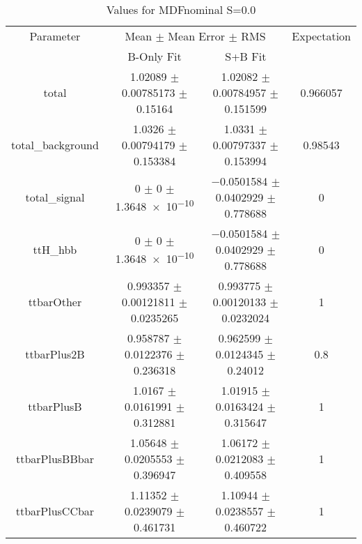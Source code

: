 \begin{table}
\centering
\caption{Values for MDFnominal S=0.0}
\begin{tabular}{cccc}
\toprule
Parameter & \multicolumn{2}{c}{Mean $\pm$ Mean Error $\pm$ RMS} & Expectation\\
 & B-Only Fit & S+B Fit & \\
\midrule
total & \num{1.02089} $\pm$ \num{0.00785173} $\pm$ \num{0.15164} & \num{1.02082} $\pm$ \num{0.00784957} $\pm$ \num{0.151599} & \num{0.966057}\\
total\_background & \num{1.0326} $\pm$ \num{0.00794179} $\pm$ \num{0.153384} & \num{1.0331} $\pm$ \num{0.00797337} $\pm$ \num{0.153994} & \num{0.98543}\\
total\_signal & \num{0} $\pm$ \num{0} $\pm$ \num{1.3648e-10} & \num{-0.0501584} $\pm$ \num{0.0402929} $\pm$ \num{0.778688} & \num{0}\\
ttH\_hbb & \num{0} $\pm$ \num{0} $\pm$ \num{1.3648e-10} & \num{-0.0501584} $\pm$ \num{0.0402929} $\pm$ \num{0.778688} & \num{0}\\
ttbarOther & \num{0.993357} $\pm$ \num{0.00121811} $\pm$ \num{0.0235265} & \num{0.993775} $\pm$ \num{0.00120133} $\pm$ \num{0.0232024} & \num{1}\\
ttbarPlus2B & \num{0.958787} $\pm$ \num{0.0122376} $\pm$ \num{0.236318} & \num{0.962599} $\pm$ \num{0.0124345} $\pm$ \num{0.24012} & \num{0.8}\\
ttbarPlusB & \num{1.0167} $\pm$ \num{0.0161991} $\pm$ \num{0.312881} & \num{1.01915} $\pm$ \num{0.0163424} $\pm$ \num{0.315647} & \num{1}\\
ttbarPlusBBbar & \num{1.05648} $\pm$ \num{0.0205553} $\pm$ \num{0.396947} & \num{1.06172} $\pm$ \num{0.0212083} $\pm$ \num{0.409558} & \num{1}\\
ttbarPlusCCbar & \num{1.11352} $\pm$ \num{0.0239079} $\pm$ \num{0.461731} & \num{1.10944} $\pm$ \num{0.0238557} $\pm$ \num{0.460722} & \num{1}\\
\bottomrule
\end{tabular}
\end{table}